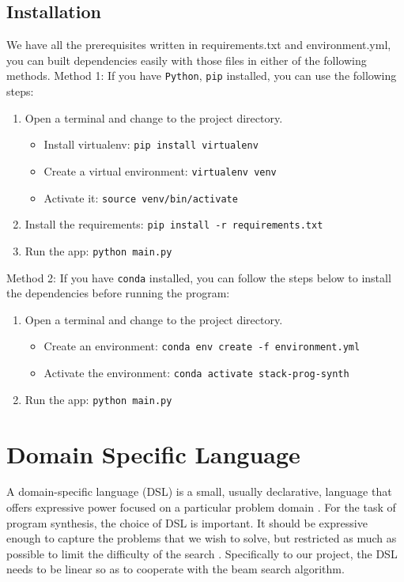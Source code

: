 \subsection{Installation}
We have all the prerequisites written in requirements.txt and environment.yml, you can built dependencies easily with those files in either of the following methods.
\noindent Method 1: If you have \texttt{Python}, \texttt{pip} installed, you can use the following steps:
\begin{enumerate}
	\item 	Open a terminal and change to the project directory.
	\begin{itemize}
		\item Install virtualenv: \texttt{pip install virtualenv}
		\item Create a virtual environment: \texttt{virtualenv venv} 
		\item Activate it: \texttt{source venv/bin/activate}
	\end{itemize}
	
	\item Install the requirements: 
	\texttt{pip install -r requirements.txt}
	
	\item Run the app:
	\texttt{python main.py}
	
\end{enumerate}

\noindent Method 2: If you have \texttt{conda} installed, you can follow the steps below to install the dependencies before running the program:
\begin{enumerate}
	\item Open a terminal and change to the project directory.
	\begin{itemize}
	    \item 	Create an environment: 
	    \texttt{conda env create -f environment.yml}
    	\item Activate the environment:
    	\texttt{conda activate stack-prog-synth}
	\end{itemize}

	\item Run the app:
	\texttt{python main.py} 
	
\end{enumerate}

\section{Domain Specific Language}
\label{sec:dsl}
A domain-specific language (DSL) is a small, usually declarative, language that offers expressive power focused on a particular problem domain \cite{dsl}. For the task of program synthesis, the choice of DSL is important. It should be expressive enough to capture the problems that we wish to solve, but restricted as much as possible to limit the difficulty of the search \cite{deepc}. Specifically to our project, the DSL needs to be linear so as to cooperate with the beam search algorithm.

